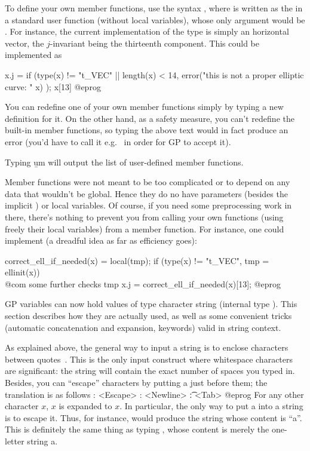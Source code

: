 To define your own member functions, use the syntax , where  is written as the  in a
standard user function (without local variables), whose only argument would
be . For instance, the current implementation of the
 type is simply an horizontal vector, the $j$-invariant being the
thirteenth component. This could be implemented as

\bprog
x.j =
{
  if (type(x) != "t_VEC" || length(x) < 14,
    error("this is not a proper elliptic curve: " x)
  );
  x[13]
}
@eprog

You can redefine one of your own member functions simply by typing a new
definition for it. On the other hand, as a safety measure, you can't redefine
the built-in member functions, so typing the above text would in fact produce
an error (you'd have to call it e.g.~ in order for GP to accept it).

Typing \b{um} will output the list of user-defined member functions.

 Member functions were not meant to be too complicated or to
depend on any data that wouldn't be global. Hence they do no have parameters
(besides the implicit ) or local variables. Of course, if you
need some preprocessing work in there, there's nothing to prevent you from
calling your own functions (using freely their local variables) from a member
function. For instance, one could implement (a dreadful idea as far as
efficiency goes):

\bprog
correct_ell_if_needed(x) = 
{
  local(tmp);
  if (type(x) != "t_VEC", tmp = ellinit(x))
    \\ @com some further checks
  tmp
}
x.j = correct_ell_if_needed(x)[13];
@eprog

\label{se:strings}

\noindent
GP variables can now hold values of type character string (internal type
). This section describes how they are actually used, as well as
some convenient tricks (automatic concatenation and expansion, keywords)
valid in string context.

As explained above, the general way to input a string is to enclose
characters between quotes~. This is the only input construct where
whitespace characters are significant: the string will contain the exact
number of spaces you typed in. Besides, you can ``escape'' characters by
putting a \kbd{\bs} just before them; the translation is as follows
\bprog
   \e: <Escape>
   \n: <Newline>
   \t: <Tab>
@eprog
For any other character $x$, \b{$x$} is expanded to $x$. In particular, the
only way to put a  into a string is to escape it. Thus, for
instance,  would produce the string whose content is
``a''. This is definitely  the same thing as typing ,
whose content is merely the one-letter string a.

